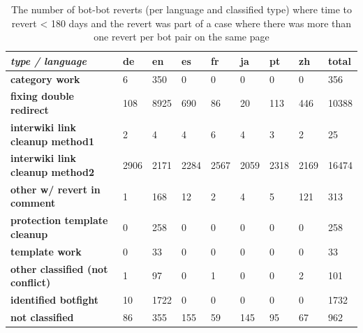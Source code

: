 \documentclass[format=acmsmall, review=false, screen=true]{acmart}%
\begin{document}
\begin{table}[h]
\centering
\begin{tabular}{|l|l|l|l|l|l|l|l|l|}
\hline
\textbf{\textit{type / language}}                           & \textbf{de} & \textbf{en} & \textbf{es} & \textbf{fr} & \textbf{ja} & \textbf{pt} & \textbf{zh} & \textbf{total} \\ \hline
\textbf{category work}                     & 6           & 350         & 0           & 0           & 0           & 0           & 0           & 356            \\ \hline
\textbf{fixing double redirect}            & 108         & 8925        & 690         & 86          & 20          & 113         & 446         & 10388          \\ \hline
\textbf{interwiki link cleanup method1} & 2           & 4           & 4           & 6           & 4           & 3           & 2           & 25             \\ \hline
\textbf{interwiki link cleanup method2} & 2906        & 2171        & 2284        & 2567        & 2059        & 2318        & 2169        & 16474          \\ \hline
\textbf{other w/ revert in comment}        & 1           & 168         & 12          & 2           & 4           & 5           & 121         & 313            \\ \hline
\textbf{protection template cleanup}       & 0           & 258         & 0           & 0           & 0           & 0           & 0           & 258            \\ \hline
\textbf{template work}                     & 0           & 33          & 0           & 0           & 0           & 0           & 0           & 33             \\ \hline
\textbf{other classified (not conflict)}                  & 1           & 97          & 0           & 1           & 0           & 0           & 2           & 101            \\ \hline
\textbf{identified botfight}               & 10          & 1722        & 0           & 0           & 0           & 0           & 0           & 1732           \\ \hline
\textbf{not classified}                    & 86          & 355         & 155         & 59          & 145         & 95          & 67          & 962            \\ \hline
\end{tabular}
\caption{The number of bot-bot reverts (per language and classified type) where time to revert < 180 days and the revert was part of a case where there was more than one revert per bot pair on the same page}
\label{suspected-bot-fights}
\end{table}
\end{document}
